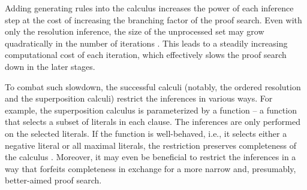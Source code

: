 

Adding generating rules into the calculus increases the power of each inference step at the cost of increasing the branching factor of the proof search.
Even with only the resolution inference, the size of the unprocessed set may grow quadratically in the number of iterations \cite{}.
This leads to a steadily increasing computational cost of each iteration,
which effectively slows the proof search down in the later stages.


To combat such slowdown, the successful calculi (notably, the ordered resolution and the superposition calculi) restrict the inferences in various ways.
For example, the superposition calculus is parameterized by a  function -- a function that selects a subset of literals in each clause.
The inferences are only performed on the selected literals.
If the function is well-behaved,
i.e., it selects either a negative literal or all maximal literals,
the restriction preserves completeness of the calculus \cite{DBLP:journals/logcom/BachmairG94}.
Moreover, it may even be beneficial to restrict the inferences in a way that forfeits completeness
in exchange for a more narrow and, presumably, better-aimed proof search.

